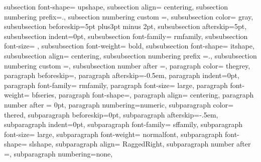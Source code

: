 {{       subsection font-shape= upshape,
       subsection align= centering,
       subsection numbering prefix=\thesection.,%
       subsection numbering custom =\@arabic\c@subsection,%
       subsubsection color= gray,
       subsubsection beforeskip=5pt plus3pt minus 2pt,
       subsubsection afterskip=5pt,
       subsubsection indent=0pt,
       subsubsection font-family= rmfamily,
       subsubsection font-size= \large,  %
       subsubsection font-weight= bold,
       subsubsection font-shape= itshape,
       subsubsection align= centering,
       subsubsection numbering prefix =\thesubsection.\@arabic\c@subsubsection,
       subsubsection numbering custom =, %
       subsubsection number after =, 
%
       paragraph color= thegrey,
       paragraph beforeskip=,
       paragraph afterskip=-0.5em,
       paragraph indent=0pt,
       paragraph font-family= rmfamily,
       paragraph font-size= large,
       paragraph font-weight= bfseries,
       paragraph font-shape=,
       paragraph align= centering,
       paragraph number after = 0pt,
       paragraph numbering=numeric,
       subparagraph color= thered,
       subparagraph beforeskip=0pt,
       subparagraph afterskip=-.5em,
       subparagraph indent=0pt,
       subparagraph font-family= sffamily,
       subparagraph font-size= large,
       subparagraph font-weight= normalfont,
       subparagraph font-shape= slshape,
       subparagraph align= RaggedRight,
       subparagraph number after =, %
       subparagraph numbering=none,
     }
}
